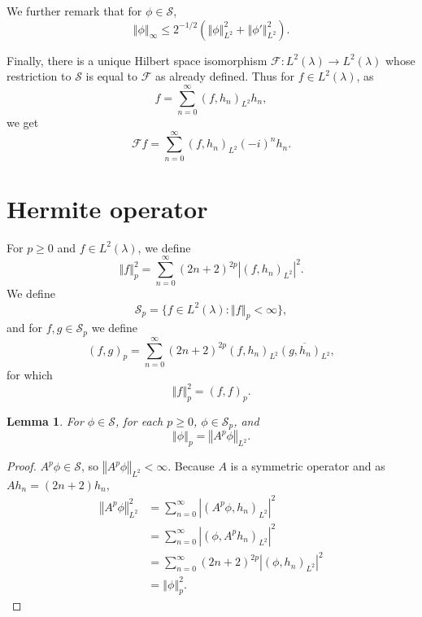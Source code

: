 \documentclass{article}
\newcommand{\norm}[1]{\left\Vert #1 \right\Vert}
\newtheorem{lemma}[theorem]{Lemma}
\theoremstyle{definition}
\begin{document}
We further remark that for $\phi \in \mathscr{S}$,
\begin{equation}
\norm{\phi}_{\infty} \leq 2^{-1/2}(\norm{\phi}_{L^2}^2+\norm{\phi'}_{L^2}^2).
\label{supremum}
\end{equation}

Finally, there is a unique Hilbert space isomorphism $\mathscr{F}:L^2(\lambda) \to L^2(\lambda)$ whose
restriction to $\mathscr{S}$ is equal to $\mathscr{F}$ as already defined. Thus for $f \in L^2(\lambda)$, as
\[
f=\sum_{n=0}^\infty (f,h_n)_{L^2} h_n,
\]
we get
\[
\mathscr{F}f = \sum_{n=0}^\infty (f,h_n)_{L^2} (-i)^n h_n.
\]


\section{Hermite operator}
For $p \geq 0$ and $f \in L^2(\lambda)$, we define
\[
\norm{f}_p^2 = \sum_{n=0}^\infty (2n+2)^{2p} |(f,h_n)_{L^2}|^2.
\]
We define 
\[
\mathscr{S}_p = \{f \in L^2(\lambda): \norm{f}_p < \infty\},
\]
and for $f,g \in \mathscr{S}_p$ we define
\[
(f,g)_p = \sum_{n=0}^\infty (2n+2)^{2p} (f,h_n)_{L^2} \overline{(g,h_n)_{L^2}},
\]
for which
\[
\norm{f}_p^2 = (f,f)_p. 
\]

\begin{lemma}
For $\phi \in \mathscr{S}$, for each $p \geq 0$, $\phi \in \mathscr{S}_p$,
and 
\[
\norm{\phi}_p = \norm{A^p \phi}_{L^2}.
\]
\label{phermite}
\end{lemma}
\begin{proof}
$A^p \phi \in \mathscr{S}$, so
$\norm{A^p \phi}_{L^2}<\infty$. 
Because $A$ is a symmetric operator and
as $Ah_n=(2n+2) h_n$,
\begin{align*}
\norm{A^p\phi}_{L^2}^2&=\sum_{n=0}^\infty |(A^p\phi,h_n)_{L^2}|^2\\
&=\sum_{n=0}^\infty |(\phi,A^ph_n)_{L^2}|^2\\
&=\sum_{n=0}^\infty (2n+2)^{2p} |(\phi,h_n)_{L^2}|^2\\
&=\norm{\phi}_p^2.
\end{align*}
\end{proof}
\end{document}
